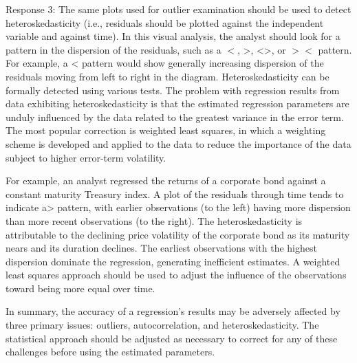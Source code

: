 \documentclass[11pt]{article}
\begin{document}
Response 3: The same plots used for outlier examination should be used to detect heteroskedasticity (i.e., residuals should be plotted against the independent variable and against time). In this visual analysis, the analyst should look for a pattern in the dispersion of the residuals, such as a $<$, >, <>, or $><$ pattern. For example, a < pattern would show generally increasing dispersion of the residuals moving from left to right in the diagram. Heteroskedasticity can be formally detected using various tests. The problem with regression results from data exhibiting heteroskedasticity is that the estimated regression parameters are unduly influenced by the data related to the greatest variance in the error term. The most popular correction is weighted least squares, in which a weighting scheme is developed and applied to the data to reduce the importance of the data subject to higher error-term volatility.

For example, an analyst regressed the returns of a corporate bond against a constant maturity Treasury index. A plot of the residuals through time tends to indicate a> pattern, with earlier observations (to the left) having more dispersion than more recent observations (to the right). The heteroskedasticity is attributable to the declining price volatility of the corporate bond as its maturity nears and its duration declines. The earliest observations with the highest dispersion dominate the regression, generating inefficient estimates. A weighted least squares approach should be used to adjust the influence of the observations toward being more equal over time.

In summary, the accuracy of a regression's results may be adversely affected by three primary issues: outliers, autocorrelation, and heteroskedasticity. The statistical approach should be adjusted as necessary to correct for any of these challenges before using the estimated parameters.
\end{document}
